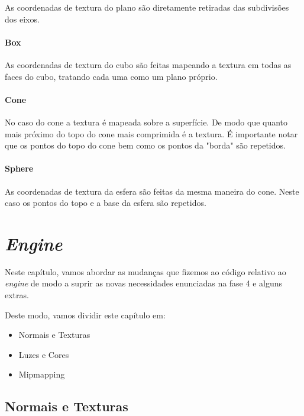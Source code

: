 \documentclass[14pt, a4 paper]{report}
\begin{document}
As coordenadas de textura do plano são diretamente retiradas das subdivisões dos eixos.

\subsubsection{Box}

As coordenadas de textura do cubo são feitas mapeando a textura em todas as faces do cubo, tratando cada uma como um plano próprio.

\subsubsection{Cone}

No caso do cone a textura é mapeada sobre a superfície. De modo que quanto mais próximo do topo do cone mais comprimida é a textura.
É importante notar que os pontos do topo do cone bem como os pontos da "borda" são repetidos.

\subsubsection{Sphere}

As coordenadas de textura da esfera são feitas da mesma maneira do cone.
Neste caso os pontos do topo e a base da esfera são repetidos.

\chapter{\textit{Engine}} \label{chap:engine}

Neste capítulo, vamos abordar as mudanças que fizemos ao código relativo ao \textit{engine} de modo a suprir as novas necessidades enunciadas na fase 4 e alguns extras.

Deste modo, vamos dividir este capítulo em:

\begin{itemize}

\item Normais e Texturas
\item Luzes e Cores
\item Mipmapping

\end{itemize}

\section{Normais e Texturas}
\end{document}
